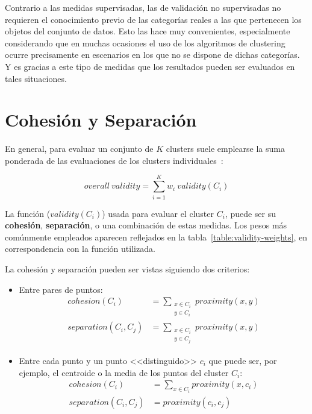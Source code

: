 Contrario a las medidas supervisadas, las de validación no supervisadas no requieren el conocimiento previo de las categorías reales a las que pertenecen los objetos del conjunto de datos.
Esto las hace muy convenientes, especialmente considerando que en muchas ocasiones el uso de los algoritmos de clustering ocurre precisamente en escenarios en los que no se dispone de dichas categorías.
Y es gracias a este tipo de medidas que los resultados pueden ser evaluados en tales situaciones.

\section{Cohesión y Separación}\label{sec:cohesiónYSeparación}

En general, para evaluar un conjunto de $K$ clusters suele emplearse la suma ponderada de las evaluaciones de los clusters individuales~\cite{Tan05}:

\begin{equation}
    \label{eq:overall-validity}
    overall\ validity = \sum_{i=1}^{K}{w_i\ validity(C_i)}
\end{equation}

La función ($validity(C_i)$) usada para evaluar el cluster $C_i$, puede ser su \textbf{cohesión}, \textbf{separación}, o una combinación de estas medidas.
Los pesos más comúnmente empleados aparecen reflejados en la tabla~\ref{table:validity-weights}, en correspondencia con la función utilizada.

La cohesión y separación pueden ser vistas siguiendo dos criterios:

\begin{itemize}
    \item Entre pares de puntos:
    \begin{align}
        cohesion(C_i) & = \sum_{\substack{x\in C_i \\ y\in C_i}}{proximity(x,y)} \\
        separation(C_i, C_j) & = \sum_{\substack{x\in C_i \\ y\in C_j}}{proximity(x,y)}
    \end{align}

    \item Entre cada punto y un punto <<distinguido>> $c_i$ que puede ser, por ejemplo, el centroide o la media de los puntos del cluster $C_i$:
    \begin{align}
        cohesion(C_i) & = \sum_{x\in C_i}{proximity(x,c_i)} \\
        separation(C_i, C_j) & = proximity(c_i,c_j)
    \end{align}
\end{itemize}

